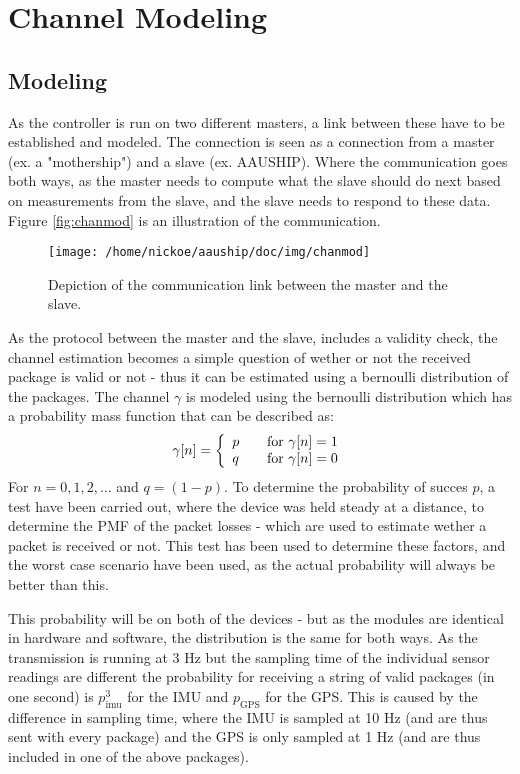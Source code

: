 \chapter*{Channel Modeling}
\section{Modeling}
As the controller is run on two different masters, a link between these have to be established and modeled. The connection is seen as a connection from a master (ex. a "mothership") and a slave (ex. AAUSHIP). Where the communication goes both ways, as the master needs to compute what the slave should do next based on measurements from the slave, and the slave needs to respond to these data. Figure \vref{fig:chanmod} is an illustration of the communication. 

\begin{figure}[htbp]
		\begin{center}
			\texttt{[image: /home/nickoe/aauship/doc/img/chanmod]}
			\caption{Depiction of the communication link between the master and the slave.}
			\label{fig:chanmod}
		\end{center}
\end{figure}

As the protocol between the master and the slave, includes a validity check, the channel estimation becomes a simple question of wether or not the received package is valid or not - thus it can be estimated using a bernoulli distribution of the packages. The channel $\gamma$ is modeled using the bernoulli distribution which has a probability mass function that can be described as:
\begin{align}
\gamma[n] = 
\left\{ 
  \begin{array}{l l}
    p & \quad \text{for}\,\, \gamma[n] = 1\\
    q & \quad \text{for}\,\, \gamma[n] = 0
  \end{array} \right.
\end{align}
For $n = 0,1,2,\dots$ and $q = (1-p)$. To determine the probability of succes $p$, a test have been carried out, where the device was held steady at a distance, to determine the PMF of the packet losses - which are used to estimate wether a packet is received or not. This test has been used to determine these factors, and the worst case scenario have been used, as the actual probability will always be better than this. 

This probability will be on both of the devices - but as the modules are identical in hardware and software, the distribution is the same for both ways. As the transmission is running at 3 Hz but the sampling time of the individual sensor readings are different the probability for receiving a string of valid packages (in one second) is $p_\text{imu}^{3}$ for the IMU and $p_\text{GPS}$ for the GPS. This is caused by the difference in sampling time, where the IMU is sampled at 10 Hz (and are thus sent with every package) and the GPS is only sampled at 1 Hz (and are thus included in one of the above packages). 

